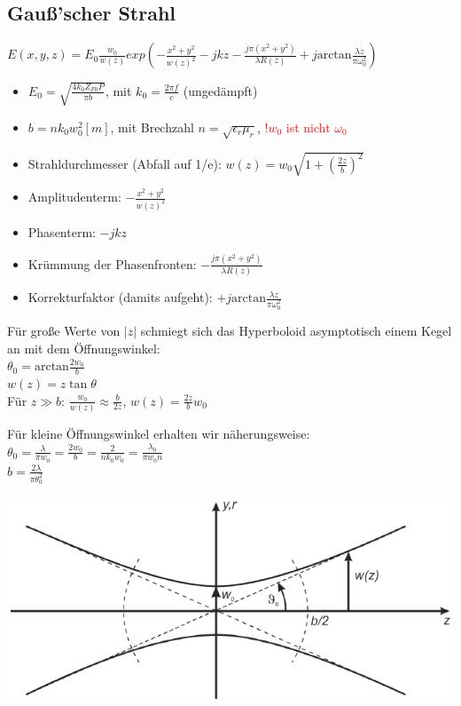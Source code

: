 \documentclass[english]{latex4ei/latex4ei_sheet}
\newcommand{\danger}[1]{\textcolor{red}{#1}}
\begin{document}
\begin{sectionbox}
    \subsection{Gauß'scher Strahl}
    \begin{emphbox}
        $E(x,y,z) = E_0\frac{w_0}{w(z)}exp\left(-\frac{x^2+y^2}{w(z)^2} -jkz - \frac{j\pi (x^2+y^2)}{\lambda R(z)} +j\text{arctan}\frac{\lambda z}{\pi \omega_0^2}\right)$
    \end{emphbox}
    \begin{itemize}
        \item $E_0 = \sqrt{\frac{4 k_{0} Z_{F 0} P}{\pi b}}$, mit $k_0 = \frac{2\pi f}{c}$ (ungedämpft)
        \item $b = n k_0 w_0^2[m]$, mit Brechzahl $n = \sqrt{\epsilon_r \mu_r}$, \danger{!$w_0$ ist nicht $\omega_0$}
        \item Strahldurchmesser (Abfall auf 1/e): $w(z) = w_0 \sqrt{1 + \left(\frac{2z}{b}\right)^2}$
        \item Amplitudenterm: $-\frac{x^2+y^2}{w(z)^2}$
        \item Phasenterm: $-jkz$
        \item Krümmung der Phasenfronten: $- \frac{j\pi (x^2+y^2)}{\lambda R(z)}$
        \item Korrekturfaktor (damits aufgeht): $+j\text{arctan}\frac{\lambda z}{\pi \omega_0^2}$
    \end{itemize}
    Für große Werte von $|z|$ schmiegt sich das Hyperboloid asymptotisch einem Kegel an mit dem Öffnungswinkel:\\
    $\theta_0 = \text{arctan}\frac{2w_0}{b}$\\
    $w(z) = z\tan\theta$\\
    Für $z \gg b$: $\frac{w_0}{w(z)} \approx \frac{b}{2z}$, $w(z) = \frac{2z}{b}w_0$

    Für kleine Öffnungswinkel erhalten wir näherungsweise:\\
    $\theta_0 = \frac{\lambda}{\pi w_0} = \frac{2w_0}{b} = \frac{2}{nk_0w_0} = \frac{\lambda_0}{\pi w_0 n}$\\
    $b=\frac{2 \lambda}{\pi \theta_{0}^{2}}$

    \includegraphics[width = \columnwidth]{./img/gauss_strahl.png}\\


\end{sectionbox}
\end{document}
